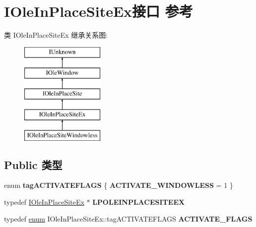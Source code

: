 \hypertarget{interface_i_ole_in_place_site_ex}{}\section{I\+Ole\+In\+Place\+Site\+Ex接口 参考}
\label{interface_i_ole_in_place_site_ex}
类 I\+Ole\+In\+Place\+Site\+Ex 继承关系图\+:\begin{figure}[H]
\begin{center}
\leavevmode
\includegraphics[height=5.000000cm]{interface_i_ole_in_place_site_ex}
\end{center}
\end{figure}
\subsection*{Public 类型}
\begin{DoxyCompactItemize}
\item 
\mbox{\label{interface_i_ole_in_place_site_ex_ac167e10fb17eb11fcbb8cedb98742162}} 
enum {\bfseries tag\+A\+C\+T\+I\+V\+A\+T\+E\+F\+L\+A\+GS} \{ {\bfseries A\+C\+T\+I\+V\+A\+T\+E\+\_\+\+W\+I\+N\+D\+O\+W\+L\+E\+SS} = 1
 \}
\item 
\mbox{\label{interface_i_ole_in_place_site_ex_aa54fc9eea67179af6b390414047ee149}} 
typedef \hyperlink{interface_i_ole_in_place_site_ex}{I\+Ole\+In\+Place\+Site\+Ex} $\ast$ {\bfseries L\+P\+O\+L\+E\+I\+N\+P\+L\+A\+C\+E\+S\+I\+T\+E\+EX}
\item 
\mbox{\label{interface_i_ole_in_place_site_ex_ad33d83385609d6b2cc7d593fd6788e8c}} 
typedef \hyperlink{interfaceenum}{enum} I\+Ole\+In\+Place\+Site\+Ex\+::tag\+A\+C\+T\+I\+V\+A\+T\+E\+F\+L\+A\+GS {\bfseries A\+C\+T\+I\+V\+A\+T\+E\+\_\+\+F\+L\+A\+GS}
\end{DoxyCompactItemize}
